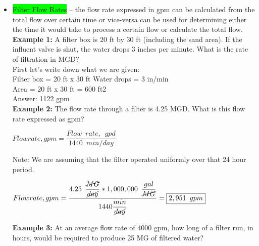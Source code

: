 \documentclass{article}
\begin{document}
\begin{itemize}
\item \colorbox{lime}{Filter Flow Rates} – the flow rate expressed in gpm can be calculated from the total flow over certain time or vice-versa can be used for determining either the time it would take to process a certain flow or calculate the total flow.\\

 

 

\textbf{Example 1:}  A filter box is 20 ft by 30 ft (including the sand area). If the influent valve is shut, the water drops 3 inches per minute. What is the rate of filtration in MGD?\\

First let's write down what we are given:\\

 

Filter box = 20 ft x 30 ft Water drops = 3 in/min\\

Area = 20 ft x 30 ft = 600 ft2\\

Answer:  1122 gpm\\

 

 

\textbf{Example 2:}  The flow rate through a filter is 4.25 MGD. What is this flow rate expressed as gpm?\\

\vspace{0.2cm}

$Flow rate, gpm=\dfrac{Flow \enspace rate, \enspace gpd}{1440 \enspace min/day}$\\

\vspace{0.2cm}

Note:  We are assuming that the filter operated uniformly over that 24 hour period.\\

\vspace{0.3cm}

$Flow rate, gpm=\dfrac{4.25 \enspace \dfrac{\cancel{MG}}{\cancel{day}} *1,000,000 \enspace \dfrac{gal}{\cancel{MG}}}{1440\dfrac{min}{\cancel{day}}}=\boxed{2,951 \enspace gpm}$

 

\vspace{0.3cm}

\textbf{Example 3:}  At an average flow rate of 4000 gpm, how long of a filter run, in hours, would be required to produce 25 MG of filtered water?\\


\end{itemize}
\end{document}
